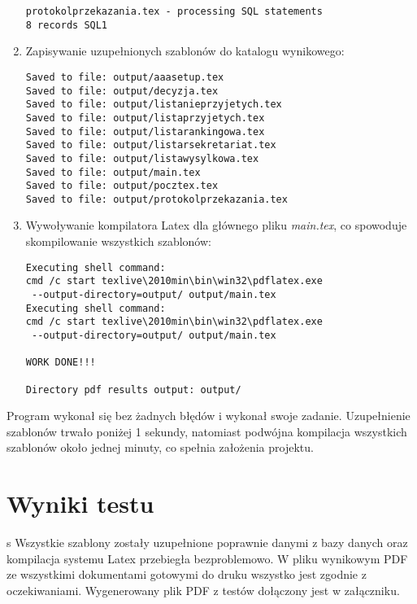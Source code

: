 \begin{enumerate}
\begin{lstlisting}
protokolprzekazania.tex - processing SQL statements
8 records SQL1

 \end{lstlisting}
 
   \item Zapisywanie uzupełnionych szablonów do katalogu wynikowego:
 \begin{lstlisting}
Saved to file: output/aaasetup.tex
Saved to file: output/decyzja.tex
Saved to file: output/listanieprzyjetych.tex
Saved to file: output/listaprzyjetych.tex
Saved to file: output/listarankingowa.tex
Saved to file: output/listarsekretariat.tex
Saved to file: output/listawysylkowa.tex
Saved to file: output/main.tex
Saved to file: output/pocztex.tex
Saved to file: output/protokolprzekazania.tex

 \end{lstlisting}
 
   \item Wywoływanie kompilatora Latex dla głównego pliku \emph{main.tex}, co spowoduje skompilowanie wszystkich szablonów:
 \begin{lstlisting}
Executing shell command:
cmd /c start texlive\2010min\bin\win32\pdflatex.exe
 --output-directory=output/ output/main.tex
Executing shell command:
cmd /c start texlive\2010min\bin\win32\pdflatex.exe
 --output-directory=output/ output/main.tex

WORK DONE!!!

Directory pdf results output: output/
 \end{lstlisting}
\end{enumerate}
Program wykonał się bez żadnych błędów i wykonał swoje zadanie. Uzupełnienie szablonów trwało poniżej 1 sekundy, natomiast podwójna kompilacja wszystkich szablonów około jednej minuty, co spełnia założenia projektu. 

\section{Wyniki testu}
s
Wszystkie szablony zostały uzupełnione poprawnie danymi z bazy danych oraz kompilacja systemu Latex przebiegła bezproblemowo. W pliku wynikowym PDF ze wszystkimi dokumentami gotowymi do druku wszystko jest zgodnie z oczekiwaniami. Wygenerowany plik PDF z testów dołączony jest w załączniku.


